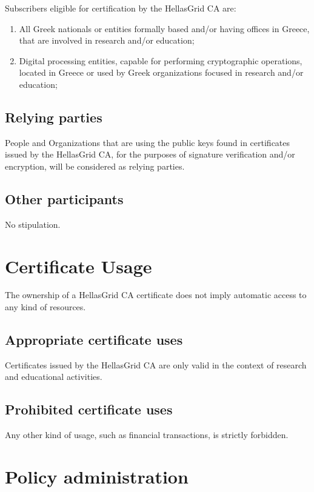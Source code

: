 Subscribers eligible for certification by the HellasGrid CA are:

\begin{enumerate}
\item{All Greek nationals or entities formally based and/or having offices in Greece, that are involved in research and/or education;}
\item{Digital processing entities, capable for performing cryptographic operations, located in Greece or used by Greek organizations focused in research and/or education;}
\end{enumerate}


\subsection{Relying parties}


People and Organizations that are using the public keys found in certificates issued by the HellasGrid CA, for the purposes of signature verification and/or encryption, will be considered as relying parties.

\subsection{Other participants}

No stipulation. 

\section{Certificate Usage}

The ownership of a HellasGrid CA certificate does not imply automatic access to any kind of resources.

\subsection{Appropriate certificate uses}

Certificates issued by the HellasGrid CA are only valid in the context of research and educational activities.

\subsection{Prohibited certificate uses}

Any other kind of usage, such as financial transactions, is strictly forbidden.

\section{Policy administration}
